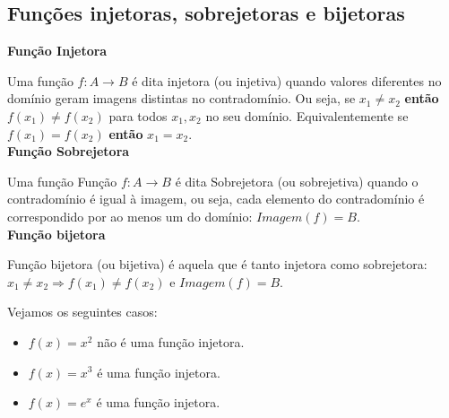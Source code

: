 \documentclass[../main.tex]{subfiles}
\begin{document}
\subsection{Funções injetoras, sobrejetoras e bijetoras}\label{subsec:Func_inj_subjet_bijetoras}
\textbf{Função Injetora}

Uma função \(f:A \rightarrow B\) é dita  injetora (ou injetiva) quando valores diferentes no domínio geram imagens distintas no contradomínio. Ou seja, se $x_1\neq x_2$ \textbf{então} $f(x_1)\neq f(x_2)$ para todos $x_1, x_2$ no seu domínio. Equivalentemente se $f(x_1)= f(x_2)$ \textbf{então} $x_1=x_2$.\\

\textbf{Função Sobrejetora}

Uma função Função \(f:A \rightarrow B\) é dita Sobrejetora (ou sobrejetiva) quando o contradomínio é igual à imagem, ou seja, cada elemento do contradomínio é correspondido por ao menos um do domínio: \(Imagem(f) = B\).\\

\textbf{Função bijetora}

Função bijetora (ou bijetiva) é aquela que é tanto injetora como sobrejetora: \(x_1 \not= x_2 \Rightarrow f(x_1) \not= f(x_2) \mbox{ e } Imagem(f) = B\).

\begin{ex}
  Vejamos os seguintes casos:
  \begin{itemize}
  \item $f(x) = x^2$ não é uma função injetora.
  \item $f(x) = x^3$ é uma função injetora.
  \item $f(x) = e^x$ é uma função injetora.
  \end{itemize}
\end{ex}
\end{document}
